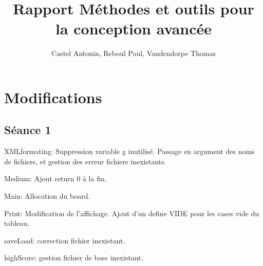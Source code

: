 \documentclass[12pt,a4paper,twoside]{report}
\title{Rapport Méthodes et outils pour la conception avancée}
\author{Castel Antonin, Reboul Paul, Vandendorpe Thomas}
\begin{document}
\maketitle{}
\section{Modifications}
\subsection{Séance 1}

XMLformating: Suppression variable g inutilisé. Passage en argument des noms de fichiers, et gestion des erreur fichiers inexistants.

Medium: Ajout return 0 à la fin.

Main: Allocation du board.

Print: Modification de l'affichage. Ajout d'un define VIDE pour les cases vide du tableau.

saveLoad: correction fichier inexistant.

highScore: gestion fichier de base inexistant.
\end{document}

